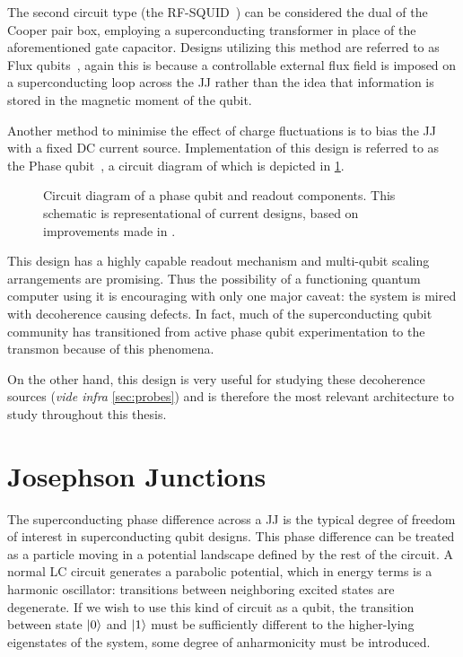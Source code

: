 The second circuit type (the RF-SQUID~\cite{Barone1982}) can be considered the dual of the Cooper pair box, employing a superconducting transformer in place of the aforementioned gate capacitor.
Designs utilizing this method are referred to as Flux qubits~\cite{Mooij1999,VanderWal2000,Chiorescu2003}, again this is because a controllable external flux field is imposed on a superconducting loop across the JJ rather than the idea that information is stored in the magnetic moment of the qubit.

Another method to minimise the effect of charge fluctuations is to bias the JJ with a fixed DC current source.
Implementation of this design is referred to as the Phase qubit~\cite{Clarke1988,Martinis2002}, a circuit diagram of which is depicted in \cref{fig:qubit}.

\begin{figure}[htp]
\resizebox{0.75\textwidth}{!}{}
\caption[Phase Qubit Circuit Diagram]{\label{fig:qubit}Circuit diagram of a phase qubit and readout components. This schematic is representational of current designs, based on improvements made in .}
\end{figure}

This design has a highly capable readout mechanism and multi-qubit scaling arrangements are promising.
Thus the possibility of a functioning quantum computer using it is encouraging with only one major caveat: the system is mired with decoherence causing defects.
In fact, much of the superconducting qubit community has transitioned from active phase qubit experimentation to the transmon because of this phenomena.

On the other hand, this design is very useful for studying these decoherence sources (\textit{vide infra} \cref{sec:probes}) and is therefore the most relevant architecture to study throughout this thesis.

\section{Josephson Junctions}\label{sec:jj}
The superconducting phase difference across a JJ is the typical degree of freedom of interest in superconducting qubit designs.
This phase difference can be treated as a particle moving in a potential landscape defined by the rest of the circuit.
A normal LC circuit generates a parabolic potential, which in energy terms is a harmonic oscillator: transitions between neighboring excited states are degenerate.
If we wish to use this kind of circuit as a qubit, the transition between state $\lvert0\rangle$ and $\lvert1\rangle$ must be sufficiently different to the higher-lying eigenstates of the system, \ie some degree of anharmonicity must be introduced.

